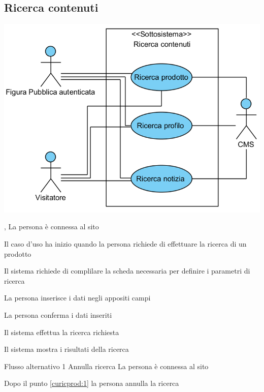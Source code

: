 \subsection{Ricerca contenuti}
\begin{center}
   \includegraphics[width=\textwidth]{assets/visualParadigm/cu/RicercaContenuti}
\end{center}
{, }
{La persona è connessa al sito}
{\postNulle}
{\begin{enumCU}
	\item Il caso d'uso ha inizio quando la persona richiede di effettuare la ricerca di un prodotto
	\item Il sistema richiede di complilare la scheda necessaria per definire i parametri di ricerca
	\item La persona inserisce i dati negli appositi campi \label{curicprod:1}
	\item La persona conferma i dati inseriti
	\item Il sistema effettua la ricerca richiesta
	\item Il sistema mostra i risultati della ricerca
	
\end{enumCU}}
%
{Flusso alternativo 1}%
{Annulla ricerca}%
{La persona è connessa al sito}%
{\postNulle}%
{\begin{enumCU}
		\item Dopo il punto \ref{curicprod:1} la persona annulla la ricerca
	\end{enumCU}}%

